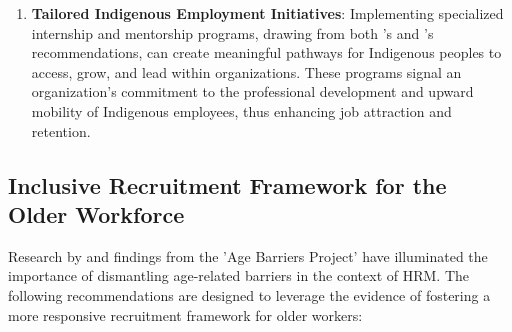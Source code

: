 \documentclass{article}
\begin{document}
\begin{enumerate}
    \item \textbf{Tailored Indigenous Employment Initiatives}: Implementing specialized internship and mentorship programs, drawing from both \textcite{pearsonExtendingBoundariesHuman2011}'s and \cite{raeDevelopingResearchPartnership2013}'s recommendations, can create meaningful pathways for Indigenous peoples to access, grow, and lead within organizations. These programs signal an organization's commitment to the professional development and upward mobility of Indigenous employees, thus enhancing job attraction and retention.
\end{enumerate}

\subsection{Inclusive Recruitment Framework for the Older Workforce}

Research by \textcite{marchiondoDevelopmentValidationWorkplace2016} and findings from the 'Age Barriers Project' \parencite{walkerCombatingAgeDiscrimination1999} have illuminated the importance of dismantling age-related barriers in the context of HRM. The following recommendations are designed to leverage the  evidence of fostering a more responsive recruitment framework for older workers:
\end{document}
